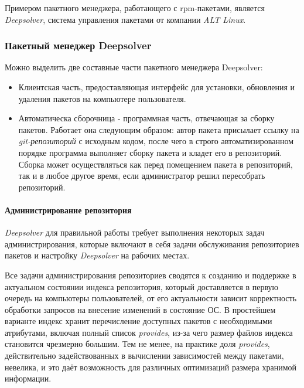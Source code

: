 Примером пакетного менеджера, работающего с rpm-пакетами, является \textit{Deepsolver},  система
управления пакетами от компании \textit{ALT Linux}.\\

\subsubsection{Пакетный менеджер Deepsolver}
Можно выделить две составные части пакетного менеджера Deepsolver:
\begin{itemize}
\item{Клиентская часть, предоставляющая интерфейс для установки, обновления
 и удаления пакетов на компьютере пользователя.}
\item{Автоматическа сборочница - программная часть, отвечающая за сборку пакетов.
Работает она следующим образом: автор пакета присылает ссылку на \textit{git-репозиторий} с исходным кодом, %
после чего в строго автоматизированном порядке программа выполняет сборку пакета и кладет
его в репозиторий. Сборка может осуществляться как перед помещением пакета в репозиторий,
так и в любое другое время, если администратор решил пересобрать репозиторий.}
\end{itemize}

\paragraph{Администрирование репозитория\\} 
\textit{Deepsolver} для правильной работы требует выполнения некоторых задач 
администрирования, которые включают в себя задачи обслуживания репозиториев
пакетов и настройку \textit{Deepsolver} на рабочих местах.

Все задачи администрирования репозиториев сводятся к созданию и поддержке в
актуальном состоянии индекса репозитория, который доставляется в первую очередь на компьютеры
пользователей, от его актуальности зависит корректность обработки запросов 
на внесение изменений в состояние ОС. В простейшем варианте индекс
хранит перечисление доступных пакетов с необходимыми атрибутами, включая
полный список \textit{provides}, из-за чего размер файлов индекса становится
чрезмерно большим. Тем не менее, на практике доля \textit{provides}, действительно
задействованных в вычислении зависимостей между пакетами, невелика,
и это даёт возможность для различных оптимизаций размера хранимой информации.

